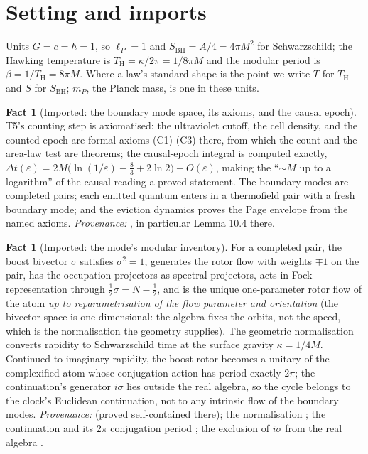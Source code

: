 \documentclass[11pt]{article}
\theoremstyle{definition}
\newtheorem{fact}[theorem]{Fact}
\renewcommand{\TH}{T_{\mathrm{H}}} %
\newcommand{\lP}{\ell_{P}}
\newcommand{\SBH}{S_{\mathrm{BH}}}
\begin{document}
\section{Setting and imports}\label{sec:setting}

Units $G = c = \hbar = 1$, so $\lP = 1$ and $\SBH = A/4 = 4\pi M^2$ for Schwarzschild; the Hawking temperature is $\TH = \kappa/2\pi = 1/8\pi M$ and the modular period is $\beta = 1/\TH = 8\pi M$. Where a law's standard shape is the point we write $T$ for $\TH$ and $S$ for $\SBH$; $m_P$, the Planck mass, is one in these units.

\begin{fact}[Imported: the boundary mode space, its axioms, and the causal epoch]\label{fact:ledger}
T5's counting step is axiomatised: the ultraviolet cutoff, the cell density, and the counted epoch are formal axioms (C1)-(C3) there, from which the count and the area-law test are theorems; the causal-epoch integral is computed exactly, $\Delta t(\varepsilon) = 2M\bigl(\ln(1/\varepsilon) - \tfrac83 + 2\ln 2\bigr) + O(\varepsilon)$, making the ``$\sim M$ up to a logarithm'' of the causal reading a proved statement. The boundary modes are completed pairs; each emitted quantum enters in a thermofield pair with a fresh boundary mode; and the eviction dynamics proves the Page envelope from the named axioms. \emph{Provenance:} \cite[\S 10--11]{ButlerT5}, in particular Lemma 10.4 there.
\end{fact}

\begin{fact}[Imported: the mode's modular inventory]\label{fact:inventory}
For a completed pair, the boost bivector $\sigma$ satisfies $\sigma^2 = 1$, generates the rotor flow with weights $\mp 1$ on the pair, has the occupation projectors as spectral projectors, acts in Fock representation through $\tfrac12\sigma = N - \tfrac12$, and is the unique one-parameter rotor flow of the atom \emph{up to reparametrisation of the flow parameter and orientation} (the bivector space is one-dimensional: the algebra fixes the orbits, not the speed, which is the normalisation the geometry supplies). The geometric normalisation converts rapidity to Schwarzschild time at the surface gravity $\kappa = 1/4M$. Continued to imaginary rapidity, the boost rotor becomes a unitary of the complexified atom whose conjugation action has period exactly $2\pi$; the continuation's generator $i\sigma$ lies outside the real algebra, so the cycle belongs to the clock's Euclidean continuation, not to any intrinsic flow of the boundary modes. \emph{Provenance:} \cite[Prop.~2.1]{ButlerT7} (proved self-contained there); the normalisation \cite[App.~A]{ButlerT5}; the continuation and its $2\pi$ conjugation period \cite[Prop.~7.21(1)]{ButlerT5}; the exclusion of $i\sigma$ from the real algebra \cite[Prop.~7.21(3)]{ButlerT5}.
\end{fact}
\end{document}
